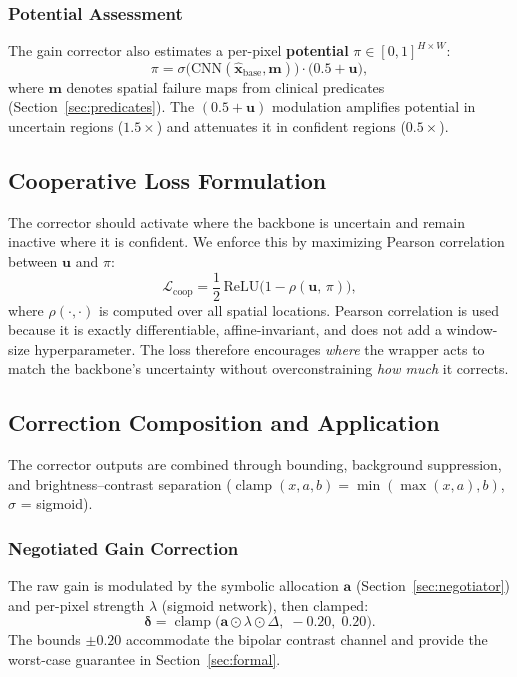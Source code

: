 \documentclass{ieeetj}
\begin{document}
\subsubsection{Potential Assessment}
The gain corrector also estimates a per-pixel \textbf{potential} $\pi \in [0,1]^{H \times W}$:
\begin{equation}
\pi = \sigma\!\big(\text{CNN}(\hat{\mathbf{x}}_\text{base}, \mathbf{m})\big) \cdot \big(0.5 + \mathbf{u}\big),
\label{eq:potential}
\end{equation}
where $\mathbf{m}$ denotes spatial failure maps from clinical predicates (Section~\ref{sec:predicates}). The $(0.5 + \mathbf{u})$ modulation amplifies potential in uncertain regions ($1.5{\times}$) and attenuates it in confident regions ($0.5{\times}$).

\subsection{Cooperative Loss Formulation}
\label{sec:coop_loss}
The corrector should activate where the backbone is uncertain and remain inactive where it is confident. We enforce this by maximizing Pearson correlation between $\mathbf{u}$ and $\pi$:
\begin{equation}
\mathcal{L}_\text{coop} = \frac{1}{2}\,\text{ReLU}\!\big(1 - \rho(\mathbf{u},\, \pi)\big),
\label{eq:coop_loss}
\end{equation}
where $\rho(\cdot,\cdot)$ is computed over all spatial locations. Pearson correlation is used because it is exactly differentiable, affine-invariant, and does not add a window-size hyperparameter. The loss therefore encourages \emph{where} the wrapper acts to match the backbone's uncertainty without overconstraining \emph{how much} it corrects.

\subsection{Correction Composition and Application}
\label{sec:correction_composition}
The corrector outputs are combined through bounding, background suppression, and brightness--contrast separation ($\operatorname{clamp}(x, a, b) = \min(\max(x, a), b)$, $\sigma$ = sigmoid).

\subsubsection{Negotiated Gain Correction}
The raw gain is modulated by the symbolic allocation $\mathbf{a}$ (Section~\ref{sec:negotiator}) and per-pixel strength $\lambda$ (sigmoid network), then clamped:
\begin{equation}
\boldsymbol{\delta} = \operatorname{clamp}\!\Big(\mathbf{a} \odot \lambda \odot \Delta,\; -0.20,\; 0.20\Big).
\label{eq:composition}
\end{equation}
The bounds $\pm 0.20$ accommodate the bipolar contrast channel and provide the worst-case guarantee in Section~\ref{sec:formal}.
\end{document}
